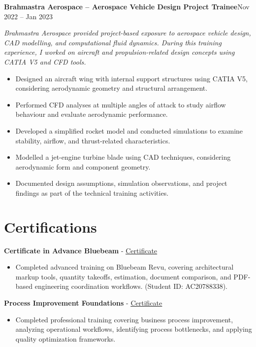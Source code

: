 \documentclass[10pt, letterpaper]{article}
\newcommand{\jobheader}[3]{\vspace{5pt}\textbf{#1 {--} #2}\hfill{\small\color{black}#3}\par\vspace{1pt}}
\newcommand{\jobcontext}[1]{{\small\textit{#1}}\vspace{3pt}\par}
\newcommand{\projheadlink}[3]{\vspace{5pt}\textbf{#1} - \href{#3}{\textcolor{linkblue}{\underline{#2}}}\par\vspace{1pt}}
\begin{document}
\vspace{3pt}

\jobheader{Brahmastra Aerospace}{Aerospace Vehicle Design Project Trainee}{Nov 2022 -- Jan 2023}
\jobcontext{Brahmastra Aerospace provided project-based exposure to aerospace vehicle design, CAD modelling, and computational fluid dynamics. During this training experience, I worked on aircraft and propulsion-related design concepts using CATIA V5 and CFD tools.}
\begin{itemize}
  \item Designed an aircraft wing with internal support structures using CATIA V5, considering aerodynamic geometry and structural arrangement.
  \item Performed CFD analyses at multiple angles of attack to study airflow behaviour and evaluate aerodynamic performance.
  \item Developed a simplified rocket model and conducted simulations to examine stability, airflow, and thrust-related characteristics.
  \item Modelled a jet-engine turbine blade using CAD techniques, considering aerodynamic form and component geometry.
  \item Documented design assumptions, simulation observations, and project findings as part of the technical training activities.
\end{itemize}

\pagebreak

\section*{Certifications}

\projheadlink{Certificate in Advance Bluebeam}{Certificate}{https://ptscadexpert.com/studentverification/}
\begin{itemize}
  \item Completed advanced training on Bluebeam Revu, covering architectural markup tools, quantity takeoffs, estimation, document comparison, and PDF-based engineering coordination workflows. (Student ID: AC20788338).
\end{itemize}

\projheadlink{Process Improvement Foundations}{Certificate}{https://www.linkedin.com/learning/certificates/7d2f3ba14333b50e4d9793a47dc750f56f2ed1d3cd54cc527a1f060d30a320dc?trk=share_certificate}
\begin{itemize}
  \item Completed professional training covering business process improvement, analyzing operational workflows, identifying process bottlenecks, and applying quality optimization frameworks.
\end{itemize}
\end{document}
